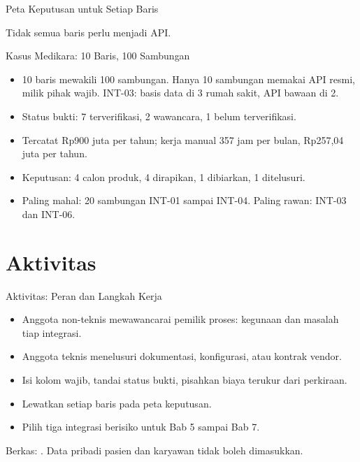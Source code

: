 \documentclass[aspectratio=169, table, 12pt]{beamer}
\begin{document}
\begin{frame}{{\Large Peta Keputusan untuk Setiap Baris}}
  \centering

  \vspace{4pt}
  {\small Tidak semua baris perlu menjadi API.}
\end{frame}

\begin{frame}{{\Large Kasus Medikara: 10 Baris, 100 Sambungan}}
  \vspace{10pt}
  \begin{itemize}
    \item 10 baris mewakili 100 sambungan. Hanya 10 sambungan memakai API resmi, milik pihak wajib. INT-03: basis data di 3 rumah sakit, API bawaan di 2.
    \item Status bukti: 7 terverifikasi, 2 wawancara, 1 belum terverifikasi.
    \item Tercatat Rp900 juta per tahun; kerja manual 357 jam per bulan, Rp257,04 juta per tahun.
    \item Keputusan: 4 calon produk, 4 dirapikan, 1 dibiarkan, 1 ditelusuri.
    \item Paling mahal: 20 sambungan INT-01 sampai INT-04. Paling rawan: INT-03 dan INT-06.
  \end{itemize}
\end{frame}

\section{Aktivitas}

\begin{frame}{{\Large Aktivitas: Peran dan Langkah Kerja}}
  \vspace{6pt}
  \begin{itemize}
    \item Anggota non-teknis mewawancarai pemilik proses: kegunaan dan masalah tiap integrasi.
    \item Anggota teknis menelusuri dokumentasi, konfigurasi, atau kontrak vendor.
    \item Isi kolom wajib, tandai status bukti, pisahkan biaya terukur dari perkiraan.
    \item Lewatkan setiap baris pada peta keputusan.
    \item Pilih tiga integrasi berisiko untuk Bab 5 sampai Bab 7.
  \end{itemize}
  \vspace{4pt}
  {\small Berkas: . Data pribadi pasien dan karyawan tidak boleh dimasukkan.}
\end{frame}
\end{document}
